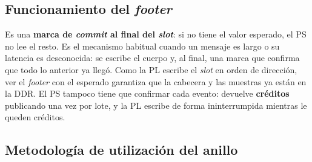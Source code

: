 \subsection{Funcionamiento del \emph{footer}}
\label{S:osc-footer}

Es una \textbf{marca de \emph{commit} al final del \emph{slot}}: si no tiene el valor
esperado, el PS no lee el resto. Es el mecanismo habitual cuando un mensaje es
largo o su latencia es desconocida: se escribe el cuerpo y, al final, una marca
que confirma que todo lo anterior ya llegó. Como la PL escribe el \emph{slot} en orden
de dirección, ver el \emph{footer} con el  esperado garantiza que la
cabecera y las muestras ya están en la DDR. El PS tampoco tiene que confirmar
cada evento: devuelve \textbf{créditos} publicando  una vez por
lote, y la PL escribe de forma ininterrumpida mientras le queden créditos.

\subsection{Metodología de utilización del anillo}
\label{S:osc-uso-anillo}

